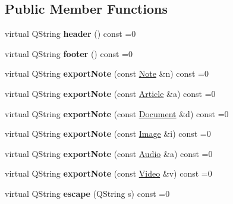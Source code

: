\subsection*{Public Member Functions}
\begin{DoxyCompactItemize}
\item 
\hypertarget{class_export_strategy_a8f24eb340762e0c1b1faaefb32087468}{virtual Q\-String {\bfseries header} () const =0}\label{class_export_strategy_a8f24eb340762e0c1b1faaefb32087468}

\item 
\hypertarget{class_export_strategy_aa7640ca5f382c7264697e594cd1288ff}{virtual Q\-String {\bfseries footer} () const =0}\label{class_export_strategy_aa7640ca5f382c7264697e594cd1288ff}

\item 
\hypertarget{class_export_strategy_afdf3bb9e2f9f0449ccb45f4d7ffe8de9}{virtual Q\-String {\bfseries export\-Note} (const \hyperlink{class_note}{Note} \&n) const =0}\label{class_export_strategy_afdf3bb9e2f9f0449ccb45f4d7ffe8de9}

\item 
\hypertarget{class_export_strategy_a5432dfb620310bc8cdb6373e8905601e}{virtual Q\-String {\bfseries export\-Note} (const \hyperlink{class_article}{Article} \&a) const =0}\label{class_export_strategy_a5432dfb620310bc8cdb6373e8905601e}

\item 
\hypertarget{class_export_strategy_a76d3850840f2cfaab4ce31960539a086}{virtual Q\-String {\bfseries export\-Note} (const \hyperlink{class_document}{Document} \&d) const =0}\label{class_export_strategy_a76d3850840f2cfaab4ce31960539a086}

\item 
\hypertarget{class_export_strategy_abbdc2355c37e746486afc5b5f1cc775a}{virtual Q\-String {\bfseries export\-Note} (const \hyperlink{class_image}{Image} \&i) const =0}\label{class_export_strategy_abbdc2355c37e746486afc5b5f1cc775a}

\item 
\hypertarget{class_export_strategy_abe7d60aa53d3ca1d23409220d3f5202a}{virtual Q\-String {\bfseries export\-Note} (const \hyperlink{class_audio}{Audio} \&a) const =0}\label{class_export_strategy_abe7d60aa53d3ca1d23409220d3f5202a}

\item 
\hypertarget{class_export_strategy_ab10a5c0dc2d001c4a3e7bbf051233581}{virtual Q\-String {\bfseries export\-Note} (const \hyperlink{class_video}{Video} \&v) const =0}\label{class_export_strategy_ab10a5c0dc2d001c4a3e7bbf051233581}

\item 
\hypertarget{class_export_strategy_ae15590aa4e2026ef61d81a016c2ecdb5}{virtual Q\-String {\bfseries escape} (Q\-String s) const =0}\label{class_export_strategy_ae15590aa4e2026ef61d81a016c2ecdb5}

\end{DoxyCompactItemize}
